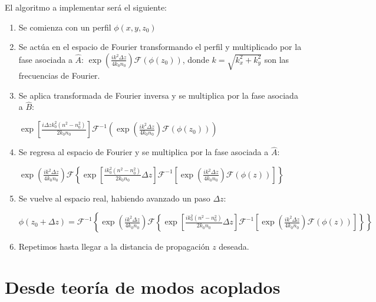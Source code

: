 El algoritmo a implementar será el siguiente:
\begin{enumerate}
	\item   Se comienza con un perfil $\phi(x, y, z_0)$
\item   Se actúa en el espacio de Fourier transformando el perfil y multiplicado por la fase asociada a $\hat{A}$: $\exp\left(\frac{ik^2\Delta z}{4k_0 n_0}\right)\mathcal{F}(\phi(z_0))$, donde $k=\sqrt{k_x^2 + k_y^2}$ son las frecuencias de Fourier.
\item   Se aplica transformada de Fourier inversa y se multiplica por la fase asociada a $\hat{B}$: 

$\exp\left[\frac{i\Delta z k_0^2(n^2-n_0^2)}{2 k_0n_0}\right]\mathcal{F}^{-1}\left(\exp\left(\frac{ik^2 \Delta z}{4k_0 n_0}\right)\mathcal{F}(\phi(z_0))\right)$
\item  Se regresa al espacio de Fourier y se multiplica por la fase asociada a $\hat{A}$:
 
$\exp\left(\frac{ik^2\Delta z}{4k_0 n_0}\right)\mathcal{F}\left\{\exp\left[\frac{ik_0^2(n^2-n_0^2)}{2 k_0n_0}\Delta z \right]\mathcal{F}^{-1}\left[\exp\left(\frac{ik^2\Delta z}{4k_0 n_0}\right)\mathcal{F}(\phi(z))\right]\right\}$
\item Se vuelve al espacio real, habiendo avanzado un paso $\Delta z$:

$\phi(z_0+\Delta z)=\mathcal{F}^{-1}\left\{\exp\left(\frac{ik^2\Delta z}{4k_0 n_0}\right)\mathcal{F}\left\{\exp\left[\frac{i k_0^2(n^2-n_0^2)}{2 k_0n_0}\Delta z\right]\mathcal{F}^{-1}\left[\exp\left(\frac{ik^2\Delta z}{4k_0 n_0}\right)\mathcal{F}(\phi(z))\right]\right\} \right\}$

\item Repetimos hasta llegar a la distancia de propagación $z$ deseada.
\end{enumerate}

\section{Desde teoría de modos acoplados}
